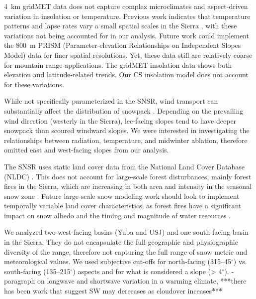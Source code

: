 4~km gridMET data does not capture complex microclimates and aspect-driven variation in insolation or temperature. Previous work indicates that temperature patterns and lapse rates vary a small spatial scales in the Sierra \citep{lundquistSurfaceTemperaturePatterns2007}, with these variations not being accounted for in our analysis. Future work could implement the 800~m PRISM (Parameter-elevation Relationships on Independent Slopes Model) data \citep{dalyStatisticalTopographicModelMapping1994} for finer spatial resolutions. Yet, these data still are relatively coarse for mountain range applications. The gridMET insolation data shows both elevation and latitude-related trends. Our CS insolation model does not account for these variations.

While not specifically parameterized in the SNSR, wind transport can substantially affect the distribution of snowpack \citep{winstralSpatialSnowModeling2002,marksSimulationTerrainForest2002}. Depending on the prevailing wind direction (westerly in the Sierra), lee-facing slopes tend to have deeper snowpack than scoured windward slopes. We were interested in investigating the relationships between radiation, temperature, and midwinter ablation, therefore omitted east and west-facing slopes from our analysis.

The SNSR uses static land cover data from the National Land Cover Database (NLDC) \citep{homerConterminousUnitedStates2020}. This does not account for large-scale forest disturbances, mainly forest fires in the Sierra, which are increasing in both area and intensity in the seasonal snow zone \cite{koshkinWildfireImpactsWestern2022}. Future large-scale snow modeling work should look to implement temporally variable land cover characteristics, as forest fires have a significant impact on snow albedo \cite{gleasonCharredForestsIncrease2013} and the timing and magnitude of water resources \citep{williamsGrowingImpactWildfire2022}.

We analyzed two west-facing basins (Yuba and USJ) and one south-facing basin in the Sierra. They do not encapsulate the full geographic and physiographic diversity of the range, therefore not capturing the full range of snow metric and meteorological values. We used subjective cut-offs for north-facing (315--45$^{\circ}$) vs. south-facing (135--215$^{\circ}$) aspects and for what is considered a slope (> 4$^{\circ}$).
% 
-paragraph on longwave and shortwave variation in a warming climate, ***there has been work that suggest SW may derecases as cloudover inceases***

